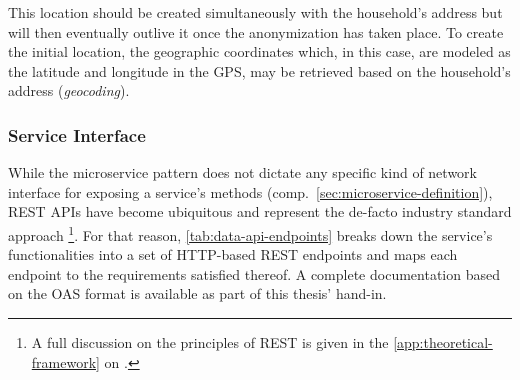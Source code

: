 This location should be created simultaneously with the household's address but will then eventually outlive it once the anonymization has taken place. To create the initial location, the geographic coordinates which, in this case, are modeled as the latitude and longitude in the \ac{GPS}, may be retrieved based on the household's address (\textit{geocoding}).


\subsubsection{Service Interface}
\label{sec:data-api-service-interface}

While the microservice pattern does not dictate any specific kind of network interface for exposing a service's methods (comp.~\autoref{sec:microservice-definition}), \acs{REST} \acsp{API} have become ubiquitous and represent the de-facto industry standard approach \footnote{A full discussion on the principles of \acs{REST} is given in the \autoref{app:theoretical-framework} on .}. For that reason, \autoref{tab:data-api-endpoints} breaks down the service's functionalities into a set of \acs{HTTP}-based \acs{REST} endpoints and maps each endpoint to the requirements satisfied thereof. A complete documentation based on the \ac{OAS} format is available as part of this thesis' hand-in.


